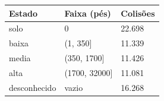 \begin{tabular}{lll}
\toprule
Estado & Faixa (pés) & Colisões \\
\midrule
solo & 0 & 22.698 \\
baixa & (1, 350] & 11.339 \\
media & (350, 1700] & 11.426 \\
alta & (1700, 32000] & 11.081 \\
desconhecido & vazio & 16.268 \\
\bottomrule
\end{tabular}
